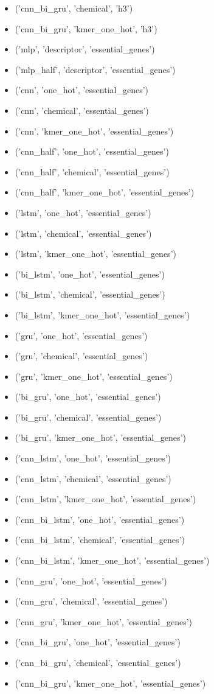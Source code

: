 \begin{itemize}
    \item ('cnn\_bi\_gru', 'chemical', 'h3')
    \item ('cnn\_bi\_gru', 'kmer\_one\_hot', 'h3')
    \item ('mlp', 'descriptor', 'essential\_genes')
    \item ('mlp\_half', 'descriptor', 'essential\_genes')
    \item ('cnn', 'one\_hot', 'essential\_genes')
    \item ('cnn', 'chemical', 'essential\_genes')
    \item ('cnn', 'kmer\_one\_hot', 'essential\_genes')
    \item ('cnn\_half', 'one\_hot', 'essential\_genes')
    \item ('cnn\_half', 'chemical', 'essential\_genes')
    \item ('cnn\_half', 'kmer\_one\_hot', 'essential\_genes')
    \item ('lstm', 'one\_hot', 'essential\_genes')
    \item ('lstm', 'chemical', 'essential\_genes')
    \item ('lstm', 'kmer\_one\_hot', 'essential\_genes')
    \item ('bi\_lstm', 'one\_hot', 'essential\_genes')
    \item ('bi\_lstm', 'chemical', 'essential\_genes')
    \item ('bi\_lstm', 'kmer\_one\_hot', 'essential\_genes')
    \item ('gru', 'one\_hot', 'essential\_genes')
    \item ('gru', 'chemical', 'essential\_genes')
    \item ('gru', 'kmer\_one\_hot', 'essential\_genes')
    \item ('bi\_gru', 'one\_hot', 'essential\_genes')
    \item ('bi\_gru', 'chemical', 'essential\_genes')
    \item ('bi\_gru', 'kmer\_one\_hot', 'essential\_genes')
    \item ('cnn\_lstm', 'one\_hot', 'essential\_genes')
    \item ('cnn\_lstm', 'chemical', 'essential\_genes')
    \item ('cnn\_lstm', 'kmer\_one\_hot', 'essential\_genes')
    \item ('cnn\_bi\_lstm', 'one\_hot', 'essential\_genes')
    \item ('cnn\_bi\_lstm', 'chemical', 'essential\_genes')
    \item ('cnn\_bi\_lstm', 'kmer\_one\_hot', 'essential\_genes')
    \item ('cnn\_gru', 'one\_hot', 'essential\_genes')
    \item ('cnn\_gru', 'chemical', 'essential\_genes')
    \item ('cnn\_gru', 'kmer\_one\_hot', 'essential\_genes')
    \item ('cnn\_bi\_gru', 'one\_hot', 'essential\_genes')
    \item ('cnn\_bi\_gru', 'chemical', 'essential\_genes')
    \item ('cnn\_bi\_gru', 'kmer\_one\_hot', 'essential\_genes')
\end{itemize}
